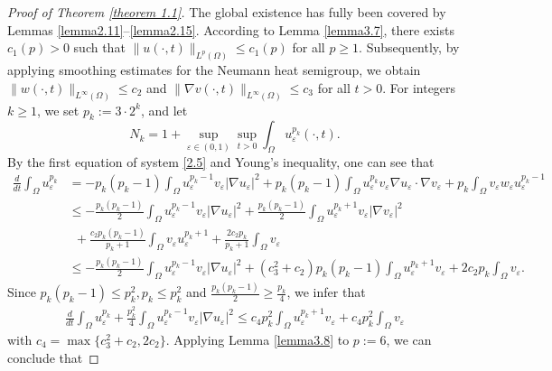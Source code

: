 \documentclass[12pt]{article}
\theoremstyle{plain}
\theoremstyle{definition}
\numberwithin{equation}{section}
\begin{document}
\begin{proof}[Proof of Theorem \ref{theorem 1.1}] The global existence has fully been covered by Lemmas \ref{lemma2.11}--\ref{lemma2.15}. According to Lemma \ref{lemma3.7}, there exists $c_1(p)>0$ such that $\|u(\cdot,t)\|_{L^p(\Omega)}\leq c_1(p)$ for all $p\geq1$. Subsequently, by applying smoothing estimates for the Neumann heat semigroup, we obtain $\|w(\cdot,t)\|_{L^{\infty}(\Omega)}\leq c_2$ and $\|\nabla v(\cdot,t)\|_{L^\infty(\Omega)}\leq c_3$ for all $t>0$. For integers $k\geq1$, we set $p_k:=3\cdot2^k$, and let
\begin{equation}\label{3.36}
    N_k=1+\sup\limits_{\varepsilon\in(0,1)}\sup\limits_{t>0}\int_\Omega u_\varepsilon^{p_k}(\cdot,t).
\end{equation}
By the first equation of system \eqref{2.5}  and Young's inequality, one can see that
\begin{align*}
        \frac{d}{dt}\int_\Omega u_\varepsilon^{p_k}&=-p_k(p_k-1)\int_\Omega u_\varepsilon^{p_k-1}v_\varepsilon|\nabla u_\varepsilon|^2+p_k(p_k-1)\int_\Omega u_\varepsilon^{p_k}v_\varepsilon\nabla u_\varepsilon\cdot\nabla v_\varepsilon+p_k\int_\Omega v_\varepsilon w_\varepsilon u_\varepsilon^{p_k-1}\\
        &\leq-\frac{p_k(p_k-1)}{2}\int_\Omega u_\varepsilon^{p_k-1}v_\varepsilon|\nabla u_\varepsilon|^2+\frac{p_k(p_k-1)}{2}\int_\Omega u_\varepsilon^{p_k+1}v_\varepsilon|\nabla v_\varepsilon|^2\\
        &~~+\frac{c_2p_k(p_k-1)}{p_k+1}\int_\Omega v_\varepsilon u_\varepsilon^{p_k+1}+\frac{2c_2 p_k}{p_k+1}\int_\Omega v_\varepsilon\\
        &\leq-\frac{p_k(p_k-1)}{2}\int_\Omega u_\varepsilon^{p_k-1}v_\varepsilon|\nabla u_\varepsilon|^2+(c_3^2+c_2)p_k(p_k-1)\int_\Omega u_\varepsilon^{p_k+1}v_\varepsilon
        +2c_2p_k\int_\Omega v_\varepsilon.
\end{align*}
Since $p_k(p_k-1)\leq p_k^2,p_k\leq p_k^2$ and $\frac{p_k(p_k-1)}{2}\geq\frac{p_k}{4}$, we infer that
\begin{equation}\label{3.37}
    \begin{split}
        \frac{d}{dt}\int_\Omega u_\varepsilon^{p_k}+\frac{p_k^2}{4}\int_\Omega u_\varepsilon^{p_k-1}v_\varepsilon|\nabla u_\varepsilon|^2\leq c_4p_k^2\int_\Omega u_\varepsilon^{p_k+1}v_\varepsilon+c_4p_k^2\int_\Omega v_\varepsilon
    \end{split}
\end{equation}
with $c_4=\max\{c_3^2+c_2,2c_2\}$. Applying Lemma \ref{lemma3.8} to $p:=6$, we can conclude that

\end{proof}
\end{document}
